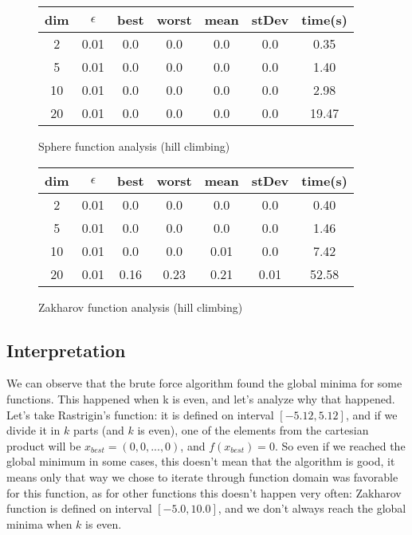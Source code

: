 \documentclass{article}
\begin{document}
\begin{figure}[!h]
	\centering
	\begin{tabular}{|| c | c | c | c | c | c | c ||}
		\hline
		dim & $\epsilon$ & best & worst & mean & stDev & time(s) \\ \hline \hline
		2 & 0.01 & 0.0 & 0.0 & 0.0 & 0.0 & 0.35 \\ \hline	
		5 & 0.01 & 0.0 & 0.0 & 0.0 & 0.0 & 1.40 \\ \hline
		10 & 0.01 & 0.0 & 0.0 & 0.0 & 0.0 & 2.98 \\ \hline
		20 & 0.01 & 0.0 & 0.0 & 0.0 & 0.0 & 19.47 \\ \hline
	\end{tabular}
	\caption{Sphere function analysis (hill climbing)}
\end{figure}

\begin{figure}[!h]
	\centering
	\begin{tabular}{|| c | c | c | c | c | c | c ||}
		\hline
		dim & $\epsilon$ & best & worst & mean & stDev & time(s) \\ \hline \hline
		2 & 0.01 & 0.0 & 0.0 & 0.0 & 0.0 & 0.40 \\ \hline	
		5 & 0.01 & 0.0 & 0.0 & 0.0 & 0.0 & 1.46 \\ \hline
		10 & 0.01 & 0.0 & 0.0 & 0.01 & 0.0 & 7.42 \\ \hline
		20 & 0.01 & 0.16 & 0.23 & 0.21 & 0.01 & 52.58 \\ \hline
	\end{tabular}
	\caption{Zakharov function analysis (hill climbing)}
\end{figure}

\subsection{Interpretation}

We can observe that the brute force algorithm found the global minima for some functions. This happened when k is even, and let's analyze why that happened. Let's take Rastrigin's function: it is defined on interval $\left[-5.12, 5.12\right]$, and if we divide it in $k$ parts (and $k$ is even), one of the elements from the cartesian product will be $x_{best}=(0,0,...,0)$, and $f(x_{best})=0$. So even if we reached the global minimum in some cases, this doesn't mean that the algorithm is good, it means only that way we chose to iterate through function domain was favorable for this function, as for other functions this doesn't happen very often: Zakharov function is defined on interval $\left[-5.0,10.0\right]$, and we don't always reach the global minima when $k$ is even.
\end{document}
